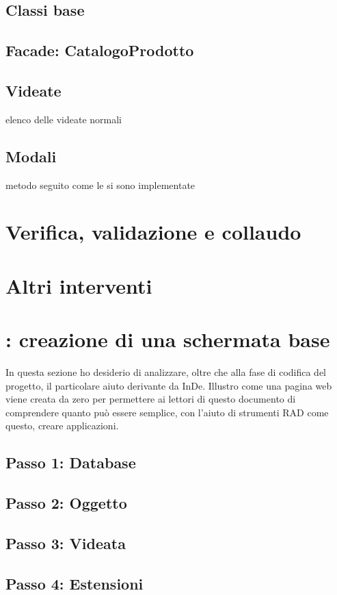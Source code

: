 
\subsection{Classi base}

\subsection{Facade: CatalogoProdotto}

\subsection{Videate}
elenco delle videate normali

\subsection{Modali}
metodo seguito come le si sono implementate


\section{Verifica, validazione e collaudo}


\section{Altri interventi}

\section{\inde: creazione di una schermata base}
In questa sezione ho desiderio di analizzare, oltre che alla fase di codifica del progetto, il particolare aiuto derivante da InDe. Illustro come una pagina web viene creata da zero per permettere ai lettori di questo documento di comprendere quanto può essere semplice, con l'aiuto di strumenti RAD come questo, creare applicazioni.

\subsection{Passo 1: Database}
\subsection{Passo 2: Oggetto}
\subsection{Passo 3: Videata}
\subsection{Passo 4: Estensioni}



